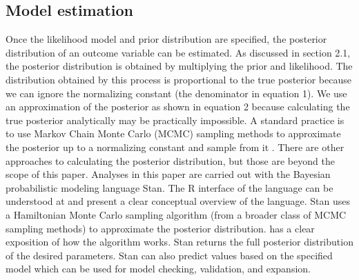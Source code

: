 \documentclass{article}
\begin{document}
\subsection{Model estimation}
Once the likelihood model and prior distribution are specified, the posterior distribution of an outcome variable can be estimated. As discussed in section 2.1, the posterior distribution is obtained by multiplying the prior and likelihood. The distribution obtained by this process is proportional to the true posterior because we can ignore the normalizing constant (the denominator in equation 1). We use an approximation of the posterior as shown in equation 2 because calculating the true posterior analytically may be practically impossible.  A standard practice is to use Markov Chain Monte Carlo (MCMC) sampling methods to approximate the posterior up to a normalizing constant and sample from it \cite{gelman2014bayesian}. There are  other approaches to calculating the posterior distribution, but those are beyond the scope of this paper. Analyses in this paper are carried out with the Bayesian probabilistic modeling language Stan. The R interface of the language can be understood at  and  present a clear conceptual overview of the language. Stan uses a Hamiltonian Monte Carlo sampling algorithm (from a broader class of MCMC sampling methods) to approximate the posterior distribution.  has a clear exposition of how the algorithm works. Stan returns the full posterior distribution of the desired parameters. Stan can also predict values based on the specified model which can be used for model checking, validation, and expansion.
\end{document}
